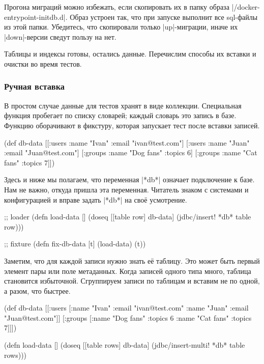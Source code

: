 Прогона миграций можно избежать, если скопировать их в папку образа
\spverb|/docker-entrypoint-initdb.d|. Образ устроен так, что при запуске
выполнит все sql-файлы из этой папки. Убедитесь, что скопировали только
\spverb|up|-миграции, иначе их \spverb|down|-версии сведут пользу на нет.

Таблицы и индексы готовы, остались данные. Перечислим способы их вставки и
очистки во время тестов.

\subsubsection*{Ручная вставка}

В простом случае данные для тестов хранят в виде коллекции. Специальная функция
пробегает по списку словарей; каждый словарь это запись в базе. Функцию
оборачивают в фикстуру, которая запускает тест после вставки записей.

\begin{english}
  \begin{clojure}
(def db-data
  [[:users {:name "Ivan" :email "ivan@test.com"}]
   [:users {:name "Juan" :email "Juan@test.com"}]
   [:groups {:name "Dog fans" :topics 6}]
   [:groups {:name "Cat fans" :topics 7}]])
  \end{clojure}
\end{english}


Здесь и ниже мы полагаем, что переменная \spverb|*db*| означает подключение к
базе. Нам не важно, откуда пришла эта переменная. Читатель знаком с системами и
конфигурацией и вправе задать \spverb|*db*| на своё усмотрение.

\begin{english}
  \begin{clojure}
;; loader
(defn load-data []
  (doseq [[table row] db-data]
    (jdbc/insert! *db* table row)))

;; fixture
(defn fix-db-data [t]
  (load-data)
  (t))
  \end{clojure}
\end{english}

Заметим, что для каждой записи нужно знать её таблицу. Это может быть первый
элемент пары  или поле метаданных. Когда записей одного
типа много, таблица становится избыточной. Сгруппируем записи по таблицам и
вставим не по одной, а разом, что быстрее.


\begin{english}
  \begin{clojure}
(def db-data
  [[:users [{:name "Ivan" :email "ivan@test.com"}
            {:name "Juan" :email "Juan@test.com"}]]
   [:groups [{:name "Dog fans" :topics 6}
             {:name "Cat fans" :topics 7}]]])

(defn load-data []
  (doseq [[table rows] db-data]
    (jdbc/insert-multi! *db* table rows)))
  \end{clojure}
\end{english}

